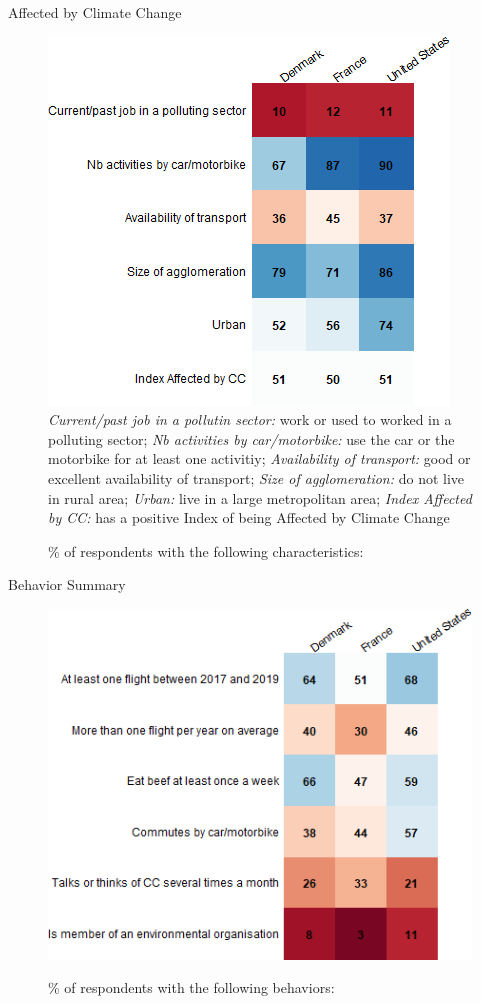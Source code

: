 \documentclass[aspectratio=169,9pt,dvipsnames]{beamer}
\begin{document}
\begin{frame}{Affected by Climate Change}%
\begin{figure}[h!]
\caption{\% of respondents with the following characteristics:}
\includegraphics[width=.4\textwidth]{../figures/country_comparison/affected_positive_countries.png} \\
\footnotesize{\textit{Current/past job in a pollutin sector:} work or used to worked in a polluting sector; \textit{Nb activities by car/motorbike:} use the car or the motorbike for at least one activitiy; \textit{Availability of transport:} good or excellent availability of transport; \textit{Size of agglomeration:} do not live in rural area; \textit{Urban:} live in a large metropolitan area; \textit{Index Affected by CC:} has a positive Index of being Affected by Climate Change}
\end{figure}
\end{frame}


\begin{frame}{Behavior Summary}%
\begin{figure}[h!]
\caption{\% of respondents with the following behaviors:}
\includegraphics[width=.6\textwidth]{../figures/country_comparison/behavior_countries.png} \\
\end{figure}
\end{frame}
\end{document}
